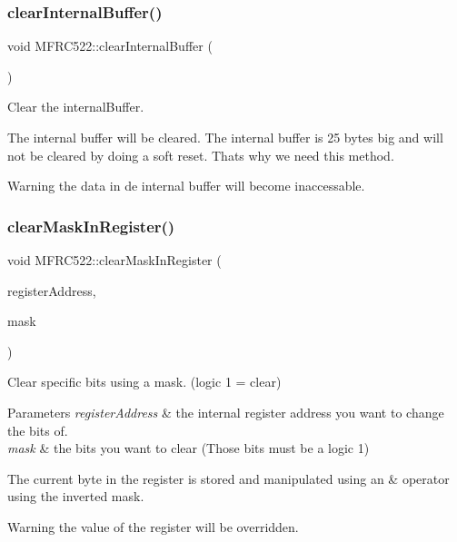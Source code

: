 \subsubsection{\texorpdfstring{clear\+Internal\+Buffer()}{clearInternalBuffer()}}
{\footnotesize\ttfamily void M\+F\+R\+C522\+::clear\+Internal\+Buffer (\begin{DoxyParamCaption}{ }\end{DoxyParamCaption})\hspace{0.3cm}{\ttfamily [private]}}



Clear the internal\+Buffer. 

The internal buffer will be cleared. The internal buffer is 25 bytes big and will not be cleared by doing a soft reset. That\textquotesingle{}s why we need this method. \begin{DoxyWarning}{Warning}
the data in de internal buffer will become inaccessable. 
\end{DoxyWarning}
\mbox{\label{class_m_f_r_c522_a9935264b559702a3a4ad2b87735b4f8f}} 
\subsubsection{\texorpdfstring{clear\+Mask\+In\+Register()}{clearMaskInRegister()}}
{\footnotesize\ttfamily void M\+F\+R\+C522\+::clear\+Mask\+In\+Register (\begin{DoxyParamCaption}\item[{\mbox{\hyperlink{class_m_f_r_c522_ae7ec09eb8c9c61288a4770175b4b8db7}{R\+EG}}}]{register\+Address,  }\item[{uint8\+\_\+t}]{mask }\end{DoxyParamCaption})\hspace{0.3cm}{\ttfamily [protected]}}



Clear specific bits using a mask. (logic 1 = clear) 


\begin{DoxyParams}{Parameters}
{\em register\+Address} & the internal register address you want to change the bits of. \\
\hline
{\em mask} & the bits you want to clear (Those bits must be a logic 1)\\
\hline
\end{DoxyParams}
The current byte in the register is stored and manipulated using an \& operator using the inverted mask. \begin{DoxyWarning}{Warning}
the value of the register will be overridden. 
\end{DoxyWarning}
\mbox{\label{class_m_f_r_c522_ab605cd58a59f1d6cbc48ef0be252e593}} 
